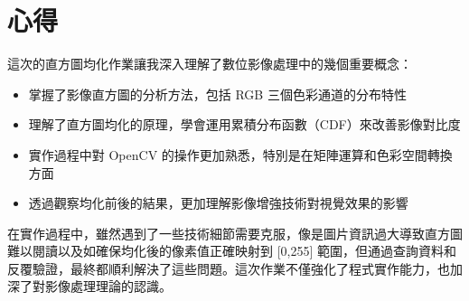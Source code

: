 \documentclass[12pt,a4paper]{article}
\begin{document}
\section{心得}

這次的直方圖均化作業讓我深入理解了數位影像處理中的幾個重要概念：

\begin{itemize}
    \item 掌握了影像直方圖的分析方法，包括 RGB 三個色彩通道的分布特性
    \item 理解了直方圖均化的原理，學會運用累積分布函數（CDF）來改善影像對比度
    \item 實作過程中對 OpenCV 的操作更加熟悉，特別是在矩陣運算和色彩空間轉換方面
    \item 透過觀察均化前後的結果，更加理解影像增強技術對視覺效果的影響
\end{itemize}

在實作過程中，雖然遇到了一些技術細節需要克服，像是圖片資訊過大導致直方圖難以閱讀以及如確保均化後的像素值正確映射到 [0,255] 範圍，但通過查詢資料和反覆驗證，最終都順利解決了這些問題。這次作業不僅強化了程式實作能力，也加深了對影像處理理論的認識。 \\
\end{document}

